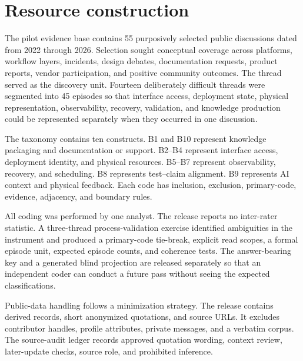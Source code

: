 \section{Resource construction}

The pilot evidence base contains 55 purposively selected public discussions dated from 2022 through 2026. Selection sought conceptual coverage across platforms, workflow layers, incidents, design debates, documentation requests, product reports, vendor participation, and positive community outcomes. The thread served as the discovery unit. Fourteen deliberately difficult threads were segmented into 45 episodes so that interface access, deployment state, physical representation, observability, recovery, validation, and knowledge production could be represented separately when they occurred in one discussion.

The taxonomy contains ten constructs. B1 and B10 represent knowledge packaging and documentation or support. B2--B4 represent interface access, deployment identity, and physical resources. B5--B7 represent observability, recovery, and scheduling. B8 represents test--claim alignment. B9 represents AI context and physical feedback. Each code has inclusion, exclusion, primary-code, evidence, adjacency, and boundary rules.

All coding was performed by one analyst. The release reports no inter-rater statistic. A three-thread process-validation exercise identified ambiguities in the instrument and produced a primary-code tie-break, explicit read scopes, a formal episode unit, expected episode counts, and coherence tests. The answer-bearing key and a generated blind projection are released separately so that an independent coder can conduct a future pass without seeing the expected classifications.

Public-data handling follows a minimization strategy. The release contains derived records, short anonymized quotations, and source URLs. It excludes contributor handles, profile attributes, private messages, and a verbatim corpus. The source-audit ledger records approved quotation wording, context review, later-update checks, source role, and prohibited inference.
